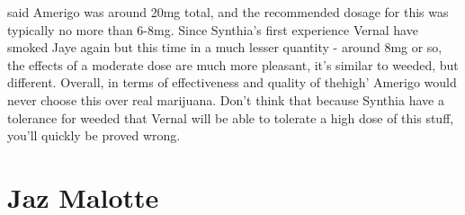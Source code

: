 \documentclass[12pt]{book}
\begin{document}
said Amerigo was around 20mg total, and the recommended dosage for this was typically no more than 6-8mg. Since Synthia's first experience Vernal have smoked Jaye again but this time in a much lesser quantity - around 8mg or so, the effects of a moderate dose are much more pleasant, it's similar to weeded, but different. Overall, in terms of effectiveness and quality of thehigh' Amerigo would never choose this over real marijuana. Don't think that because Synthia have a tolerance for weeded that Vernal will be able to tolerate a high dose of this stuff, you'll quickly be proved wrong.



\chapter{Jaz Malotte}
\end{document}
